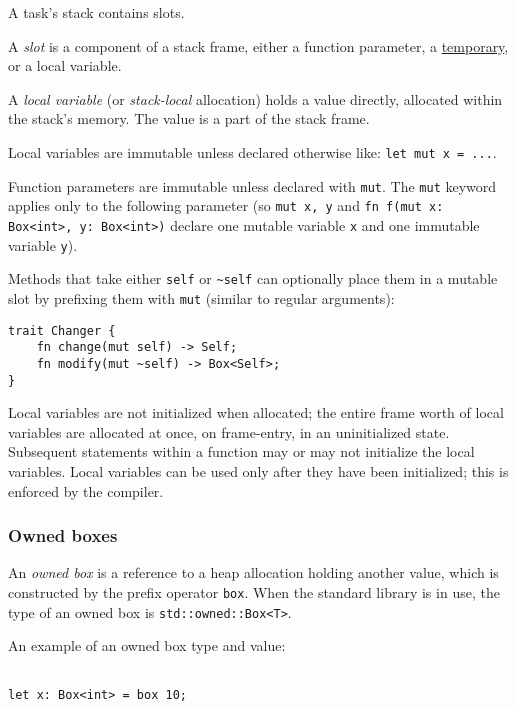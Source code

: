 \documentclass[]{article}
\begin{document}
A task's stack contains slots.

A \emph{slot} is a component of a stack frame, either a function
parameter, a \hyperref[lvalues-rvalues-and-temporaries]{temporary}, or a
local variable.

A \emph{local variable} (or \emph{stack-local} allocation) holds a value
directly, allocated within the stack's memory. The value is a part of
the stack frame.

Local variables are immutable unless declared otherwise like:
\texttt{let mut x = ...}.

Function parameters are immutable unless declared with \texttt{mut}. The
\texttt{mut} keyword applies only to the following parameter (so
\texttt{\textbar{}mut x, y\textbar{}} and
\texttt{fn f(mut x: Box\textless{}int\textgreater{}, y: Box\textless{}int\textgreater{})}
declare one mutable variable \texttt{x} and one immutable variable
\texttt{y}).

Methods that take either \texttt{self} or \texttt{\textasciitilde{}self}
can optionally place them in a mutable slot by prefixing them with
\texttt{mut} (similar to regular arguments):

\begin{verbatim}
trait Changer {
    fn change(mut self) -> Self;
    fn modify(mut ~self) -> Box<Self>;
}
\end{verbatim}

Local variables are not initialized when allocated; the entire frame
worth of local variables are allocated at once, on frame-entry, in an
uninitialized state. Subsequent statements within a function may or may
not initialize the local variables. Local variables can be used only
after they have been initialized; this is enforced by the compiler.

\subsubsection{Owned boxes}\label{owned-boxes}

An \emph{owned box} is a reference to a heap allocation holding another
value, which is constructed by the prefix operator \texttt{box}. When
the standard library is in use, the type of an owned box is
\texttt{std::owned::Box\textless{}T\textgreater{}}.

An example of an owned box type and value:

\begin{verbatim}

let x: Box<int> = box 10;
\end{verbatim}
\end{document}

